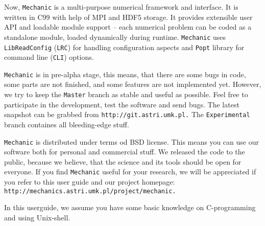 Now, {\tt Mechanic} is a multi-purpose numerical framework and interface. It is written in C99 with help of MPI and HDF5 storage. It provides extensible user API and loadable module support -- each numerical problem can be coded as a standalone module, loaded dynamically during runtime. {\tt Mechanic} uses {\tt LibReadConfig} ({\tt LRC}) for handling configuration aspects and {\tt Popt} library for command line ({\tt CLI}) options.

{\tt Mechanic} is in pre-alpha stage, this means, that there are some bugs in code, some parts are not finished, and some features are not implemented yet. However, we try to keep the {\tt Master} branch as stable and useful as possible. Feel free to participate in the development, test the software and send bugs. The latest snapshot can be grabbed from {\tt http://git.astri.umk.pl.} The {\tt Experimental} branch containes all bleeding-edge stuff.

{\tt Mechanic} is distributed under terms od BSD license. This means you can use our software both for personal and commercial stuff. We released the code to the public, because we believe, that the science and its tools should be open for everyone. If you find {\tt Mechanic} useful for your research, we will be appreciated if you refer to this user guide and our project homepage: {\tt http://mechanics.astri.umk.pl/project/mechanic.}

In this userguide, we assume you have some basic knowledge on C-programming and using Unix-shell. 